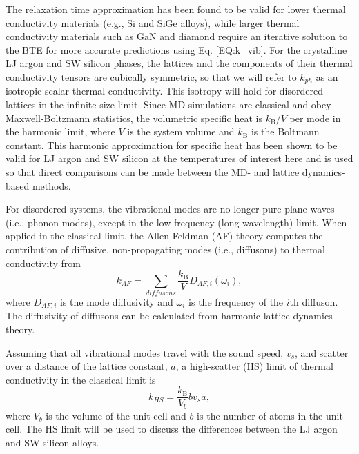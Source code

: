 The relaxation time approximation has been found to be valid  
for lower thermal conductivity materials 
(e.g., Si and SiGe alloys),
\cite{broido_intrinsic_2007,ward_intrinsic_2010,garg_role_2011} 
while larger thermal conductivity 
materials such as GaN and diamond require an  
iterative solution to the BTE for more accurate predictions 
using Eq. \eqref{EQ:k_vib}.
\cite{ward_ab_2009,lindsay_thermal_2012} 
For the crystalline LJ argon and SW silicon phases, 
the lattices and the components of their 
thermal conductivity tensors are cubically symmetric, 
so that we will refer to 
$k_{ph}$ as an isotropic scalar thermal conductivity. 
This isotropy will hold for disordered lattices 
in the infinite-size limit. 
Since MD simulations are classical 
and obey Maxwell-Boltzmann 
statistics,\cite{mcquarrie_statistical_2000} the volumetric 
specific heat is $k_{\text{B}}/V$ per mode in the harmonic limit, where $V$ 
is the system volume and $k_{\text{B}}$ is the Boltmann constant. 
This harmonic approximation for specific heat has been shown to be valid 
for LJ argon and SW silicon at the temperatures of interest here
\cite{mcgaughey_quantitative_2004,goicochea_thermal_2010} 
and is used so that direct comparisons can be made between 
the MD- and lattice dynamics-based methods.

For disordered systems, the vibrational modes are no 
longer pure plane-waves (i.e., phonon modes), except in the low-frequency 
(long-wavelength) limit. When applied in the classical limit, 
the Allen-Feldman (AF) theory computes 
the contribution of diffusive, non-propagating modes (i.e., diffusons) 
to thermal conductivity from\cite{allen_thermal_1993} 
\begin{equation}\label{EQ:M:k_AF}
k_{AF} = \sum_{diffusons} \frac{k_{\text{B}}}{V} D_{AF,i}(\omega_i),
\end{equation}
where $D_{AF,i}$ is the mode diffusivity and $\omega_i$ is the 
frequency of the $i$th diffuson. The diffusivity of diffusons 
can be calculated from harmonic lattice dynamics theory.
\cite{allen_thermal_1993,feldman_thermal_1993,feldman_numerical_1999} 

Assuming that all vibrational modes travel with the sound speed, $v_s$, and 
scatter over a distance of the lattice constant, $a$, 
a high-scatter (HS) limit of thermal conductivity in the classical 
limit is\cite{cahill_lattice_1988} 
\begin{equation}\label{EQ:M:k_AF,HS}
k_{HS} = \frac{k_{\text{B}}}{V_b}b v_s a,
\end{equation}
where $V_b$ is the volume of the unit cell and $b$ is the number of atoms 
in the unit cell. The HS limit will be used to 
discuss the differences between the LJ argon and SW silicon alloys. 

